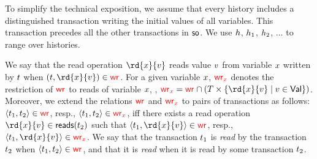 

To simplify the technical exposition, we assume that every history includes a distinguished transaction writing the initial values of all variables. This transaction precedes all the other transactions in $\so$. We use $\hist$, $\hist_1$, $\hist_2$, $\ldots$ to range over histories. 

We say that the read operation $\rd{\xvar}{\val}$ reads value $\val$ from variable $\xvar$ written by $\tr$ when $(\tr,\rd{\xvar}{\val})\in\wro$. 
For a given variable $\xvar$, $\wro[\xvar]$ denotes the restriction of $\wro$ to reads of variable $\xvar$, \ie, $\wro[\xvar]=\wro\cap (T\times \{\rd{\xvar}{\val}\mid \val\in \Val\})$. Moreover, we extend the relations $\wro$ and $\wro[\xvar]$ to pairs of transactions as follows: $\tup{\tr_1,\tr_2}\in \wro$, resp., $\tup{\tr_1,\tr_2}\in \wro[\xvar]$, iff there exists a read operation $\rd{\xvar}{\val}\in \readOp{\tr_2}$ such that $\tup{\tr_1,\rd{\xvar}{\val}}\in \wro$, resp., $\tup{\tr_1,\rd{\xvar}{\val}}\in \wro[\xvar]$. We say that the transaction $\tr_1$ is \emph{read} by the transaction $\tr_2$ when $\tup{\tr_1,\tr_2}\in \wro$, and that it is \emph{read} when it is read by some transaction $\tr_2$. 
%


